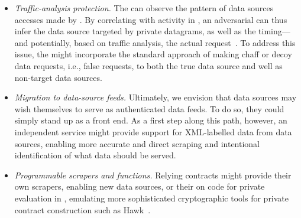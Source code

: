 \begin{itemize}
\item{\em Traffic-analysis protection.} The \medname can observe the pattern of data sources accesses made by \tc. By correlating with activity in \tcont, an adversarial \medname can thus infer the data source targeted by private datagrams, as well as the timing---and potentially, based on traffic analysis, the actual request~\cite{XiaoFeng}. To address this issue, the \encname might incorporate the standard approach of making chaff or decoy data requests, i.e., false requests, to both the true data source and well as non-target data sources.
\item{\em Migration to data-source feeds.} Ultimately, we envision that data sources may wish themselves to serve as authenticated data feeds. To do so, they could simply stand up \tc as a front end. As a first step along this path, however, an independent \tc service might provide support for XML-labelled data from data sources, enabling more accurate and direct scraping and intentional identification of what data should be served.  
\item{\em Programmable scrapers and functions.} Relying contracts might provide their own scrapers, enabling new data sources, or their on code for private evaluation in \tc, emulating more sophisticated cryptographic tools for private contract construction such as Hawk~\cite{}. 
\end{itemize}


